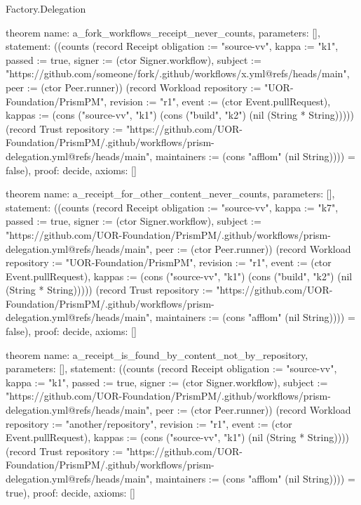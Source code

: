 \begin{lexlean}{Factory.Delegation}
\begin{semanticmodule}
theorem{
  name: a_fork_workflows_receipt_never_counts,
  parameters: [],
  statement: ((counts (record Receipt {obligation := "source-vv", kappa := "k1", passed := true, signer := (ctor Signer.workflow), subject := "https://github.com/someone/fork/.github/workflows/x.yml@refs/heads/main", peer := (ctor Peer.runner)}) (record Workload {repository := "UOR-Foundation/PrismPM", revision := "r1", event := (ctor Event.pullRequest), kappas := (cons ("source-vv", "k1") (cons ("build", "k2") (nil (String * String))))}) (record Trust {repository := "https://github.com/UOR-Foundation/PrismPM/.github/workflows/prism-delegation.yml@refs/heads/main", maintainers := (cons "afflom" (nil String))})) = false),
  proof: decide{},
  axioms: []
}

theorem{
  name: a_receipt_for_other_content_never_counts,
  parameters: [],
  statement: ((counts (record Receipt {obligation := "source-vv", kappa := "k7", passed := true, signer := (ctor Signer.workflow), subject := "https://github.com/UOR-Foundation/PrismPM/.github/workflows/prism-delegation.yml@refs/heads/main", peer := (ctor Peer.runner)}) (record Workload {repository := "UOR-Foundation/PrismPM", revision := "r1", event := (ctor Event.pullRequest), kappas := (cons ("source-vv", "k1") (cons ("build", "k2") (nil (String * String))))}) (record Trust {repository := "https://github.com/UOR-Foundation/PrismPM/.github/workflows/prism-delegation.yml@refs/heads/main", maintainers := (cons "afflom" (nil String))})) = false),
  proof: decide{},
  axioms: []
}

theorem{
  name: a_receipt_is_found_by_content_not_by_repository,
  parameters: [],
  statement: ((counts (record Receipt {obligation := "source-vv", kappa := "k1", passed := true, signer := (ctor Signer.workflow), subject := "https://github.com/UOR-Foundation/PrismPM/.github/workflows/prism-delegation.yml@refs/heads/main", peer := (ctor Peer.runner)}) (record Workload {repository := "another/repository", revision := "r1", event := (ctor Event.pullRequest), kappas := (cons ("source-vv", "k1") (nil (String * String)))}) (record Trust {repository := "https://github.com/UOR-Foundation/PrismPM/.github/workflows/prism-delegation.yml@refs/heads/main", maintainers := (cons "afflom" (nil String))})) = true),
  proof: decide{},
  axioms: []
}


\end{semanticmodule}
\end{lexlean}
